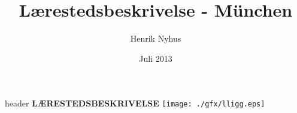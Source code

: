 

\title{Lærestedsbeskrivelse - München}
\author{Henrik Nyhus}
\date{Juli 2013}



\begin{staticcontents*}{header}
\Huge{\MakeUppercase{\textbf{Lærestedsbeskrivelse}}} 
\hfill \texttt{[image: ./gfx/lligg.eps]}
\end{staticcontents*}












\clearpage
\tableofcontents
\label{lastpage}

